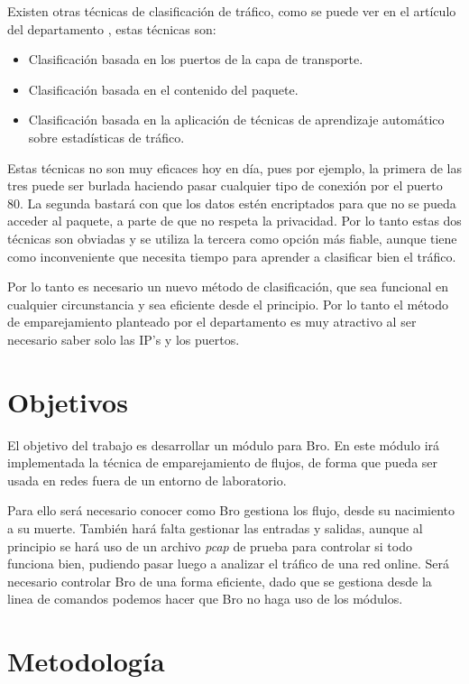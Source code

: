 \intro Existen otras técnicas de clasificación de tráfico, como se puede ver en el artículo del 
departamento \citep{comparacion}, estas técnicas son: 

\begin{itemize}
\item Clasificación basada en los puertos de la capa de transporte. \cite{iana}
\item Clasificación basada en el contenido del paquete. \cite{payload}
\item Clasificación basada en la aplicación de técnicas de aprendizaje automático sobre estadísticas 
de tráfico. \cite{learning}
\end{itemize}
Estas técnicas no son muy eficaces hoy en día, pues por ejemplo, la primera de las tres puede ser burlada 
haciendo pasar cualquier tipo de conexión por el puerto 80. La segunda bastará con que los datos estén 
encriptados para que no se pueda acceder al paquete, a parte de que no respeta la privacidad. Por lo tanto estas 
dos técnicas son obviadas y se utiliza la tercera como opción más fiable, aunque tiene como inconveniente que 
necesita tiempo para aprender a clasificar bien el tráfico.

\intro Por lo tanto es necesario un nuevo método de clasificación, que sea funcional en cualquier circunstancia 
y sea eficiente desde el principio. Por lo tanto el método de emparejamiento planteado por el departamento es 
muy atractivo al ser necesario saber solo las IP's y los puertos. \cite{comparacion}


\section{Objetivos}

El objetivo del trabajo es desarrollar un módulo para Bro. En este módulo irá implementada la técnica de emparejamiento de flujos, de forma que pueda ser usada en redes fuera de un entorno de laboratorio.

\intro Para ello será necesario conocer como Bro gestiona los flujo, desde su nacimiento a su muerte. 
\intro También hará falta gestionar las entradas y salidas, aunque al principio se hará uso de un 
archivo \textit{pcap} de prueba para controlar si todo funciona bien, 
pudiendo pasar luego a analizar el tráfico de una red online.
\intro Será necesario controlar Bro de una forma eficiente, dado que se gestiona desde la linea de comandos 
podemos hacer que Bro no haga uso de los módulos.


\section{Metodología}

